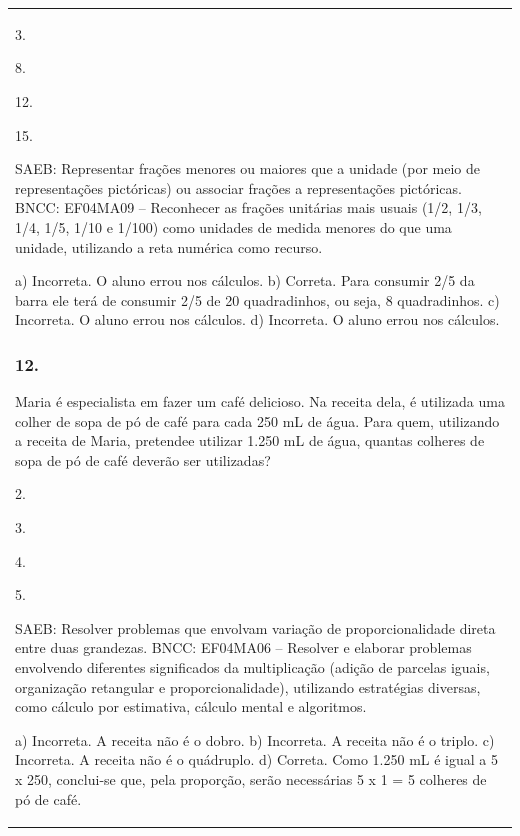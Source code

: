 \begin{mdframed}[linewidth=2pt,linecolor=salmao,roundcorner=2pt]
\begin{escolha}
{{{\begin{longtable}[]{@{}l@{}}
\begin{itemize}
{\begin{escolha}
\item
  3.
\item
  8.
\item
  12.
\item
  15.
\end{escolha}

SAEB: Representar frações menores ou maiores que a unidade
(por meio de representações pictóricas) ou associar frações a
representações pictóricas.
BNCC: EF04MA09 -- Reconhecer as frações unitárias mais usuais (1/2, 1/3, 1/4, 1/5, 1/10 e 1/100) como
unidades de medida menores do que uma unidade, utilizando a reta numérica como recurso.

a) Incorreta. O aluno errou nos cálculos.
b) Correta. Para consumir 2/5 da barra ele terá de consumir 2/5 de 20 quadradinhos, ou seja, 8 quadradinhos.
c) Incorreta. O aluno errou nos cálculos.
d) Incorreta. O aluno errou nos cálculos.

\subsubsection{12.}

Maria é especialista em fazer um café delicioso. Na receita dela, é utilizada uma colher de sopa de pó de café para cada 250 mL
de água. Para quem, utilizando a receita de Maria, pretendee utilizar 1.250
mL de água, quantas colheres de sopa de pó de café deverão ser utilizadas?

\begin{escolha}
\item
  2.
\item
  3.
\item
  4.
\item
  5.
\end{escolha}

SAEB: Resolver problemas que envolvam variação de
proporcionalidade direta entre duas grandezas.
BNCC: EF04MA06 -- Resolver e elaborar problemas envolvendo diferentes significados da multiplicação
(adição de parcelas iguais, organização retangular e proporcionalidade), utilizando estratégias
diversas, como cálculo por estimativa, cálculo mental e algoritmos.

a) Incorreta. A receita não é o dobro.
b) Incorreta. A receita não é o triplo.
c) Incorreta. A receita não é o quádruplo.
d) Correta. Como 1.250 mL é igual a 5 x 250, conclui-se que, pela proporção, serão necessárias 5 x 1 = 5 colheres de pó de café.

}
\end{itemize}
\end{longtable}}}}
\end{escolha}
\end{mdframed}
